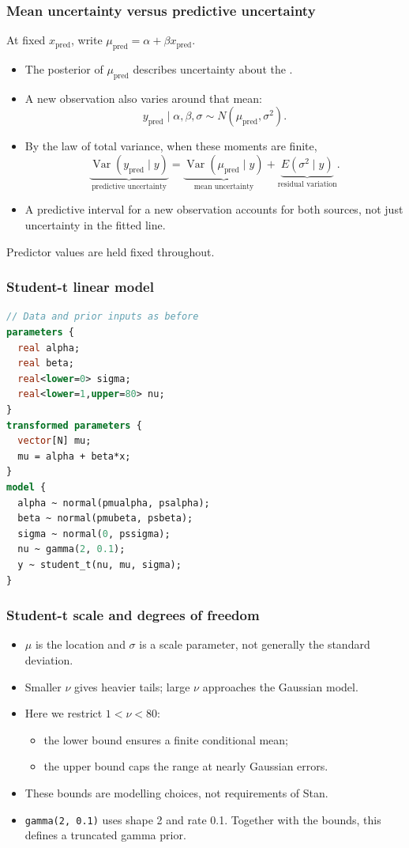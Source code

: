 \documentclass[10pt]{beamer}
\begin{document}
\begin{frame}
\frametitle{Mean uncertainty versus predictive uncertainty}

At fixed $x_{\mathrm{pred}}$, write
$\mu_{\mathrm{pred}}=\alpha+\beta x_{\mathrm{pred}}$.
\begin{itemize}
\item The posterior of $\mu_{\mathrm{pred}}$ describes uncertainty
  about the .
\item A new observation also varies around that mean:
\[
y_{\mathrm{pred}}\mid\alpha,\beta,\sigma
  \sim N(\mu_{\mathrm{pred}},\sigma^2).
\]
\pause
\item By the law of total variance, when these moments are finite,
\[
\underbrace{\operatorname{Var}(y_{\mathrm{pred}}\mid y)}_{\text{predictive uncertainty}}
=\underbrace{\operatorname{Var}(\mu_{\mathrm{pred}}\mid y)}_{\text{mean uncertainty}}
 +\underbrace{E(\sigma^2\mid y)}_{\text{residual variation}}.
\]
\item A predictive interval for a new observation accounts for both
  sources, not just uncertainty in the fitted line.
\end{itemize}
Predictor values are held fixed throughout.
\end{frame}

\begin{frame}[fragile]

\frametitle{Student-t linear model}
  {\footnotesize
  \begin{lstlisting}[language=Stan]
// Data and prior inputs as before
parameters {
  real alpha;
  real beta;
  real<lower=0> sigma;
  real<lower=1,upper=80> nu;
}
transformed parameters {
  vector[N] mu;
  mu = alpha + beta*x;
}
model {
  alpha ~ normal(pmualpha, psalpha);
  beta ~ normal(pmubeta, psbeta);
  sigma ~ normal(0, pssigma);
  nu ~ gamma(2, 0.1);
  y ~ student_t(nu, mu, sigma);
}
  \end{lstlisting}
}
\end{frame}

\begin{frame}
\frametitle{Student-t scale and degrees of freedom}
\begin{itemize}
\item $\mu$ is the location and $\sigma$ is a scale parameter, not generally the standard deviation.
\item Smaller $\nu$ gives heavier tails; large $\nu$ approaches the Gaussian model.
\item Here we restrict $1<\nu<80$:
  \begin{itemize}
  \item the lower bound ensures a finite conditional mean;
  \item the upper bound caps the range at nearly Gaussian errors.
  \end{itemize}
\item These bounds are modelling choices, not requirements of Stan.
\item \texttt{gamma(2, 0.1)} uses shape 2 and rate 0.1. Together with the bounds, this defines a truncated gamma prior.
\end{itemize}
\end{frame}
\end{document}
